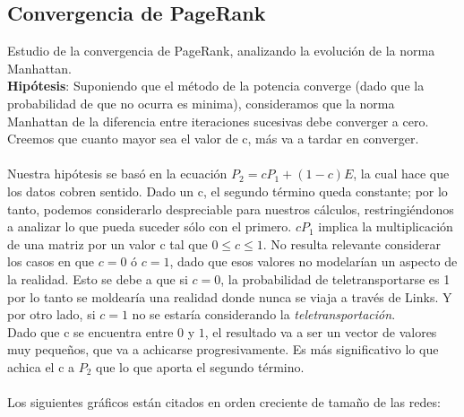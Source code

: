 \documentclass[a4paper]{article}
\begin{document}
\subsection{Convergencia de PageRank}

Estudio de la convergencia de PageRank, analizando la evolución de la norma Manhattan.\\
\textbf{Hip\'otesis}: Suponiendo que el método de la potencia converge (dado que la probabilidad de que no ocurra es minima), consideramos que la norma Manhattan de la diferencia entre iteraciones sucesivas debe converger a cero. Creemos que cuanto mayor sea el valor de c, más va a tardar en converger.\\
\\
\indent Nuestra hip\'otesis se bas\'o en la ecuaci\'on $P_2= cP_1+(1-c)E$, la cual hace que los datos cobren sentido. Dado un c, el segundo t\'ermino queda constante; por lo tanto, podemos considerarlo despreciable para nuestros cálculos, restringiéndonos a analizar lo que pueda suceder s\'olo con el primero. $cP_1$ implica la multiplicación de una matriz por un valor c tal que $0 \leq c \leq 1$. No resulta relevante considerar los casos en que $c= 0$ \'o $c=1$, dado que esos valores no modelarían un aspecto de la realidad. Esto se debe a que si $c=0$, la probabilidad de teletransportarse es 1 por lo tanto se moldear\'ia una realidad donde nunca se viaja a trav\'es de Links. Y por otro lado, si $c=1$ no se estar\'ia considerando la \emph{teletransportaci\'on}. \\
\indent Dado que c se encuentra entre $0$ y $1$, el resultado va a ser un vector de valores muy pequeños, que va a achicarse progresivamente. Es m\'as significativo lo que achica el c a $P_2$ que lo que aporta el segundo t\'ermino.   \\
\\
Los siguientes gr\'aficos est\'an citados en orden creciente de tama\~no de las redes:\\
\end{document}
